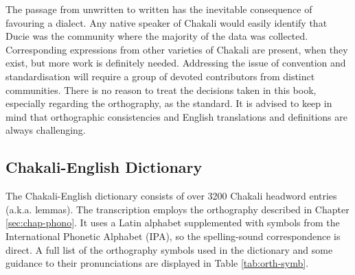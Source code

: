 The passage from unwritten to written has the inevitable consequence of 
favouring a dialect. Any native speaker of Chakali would easily identify that 
Ducie was the community where the majority of the data was collected.  
Corresponding expressions from other varieties of Chakali are present, when they 
exist,  but more work is definitely needed.   Addressing the issue of convention 
and standardisation will require a  group of devoted contributors from distinct 
communities. There is no reason to treat the decisions taken in this book, 
especially regarding the orthography,  as the standard. It is advised to keep in 
mind that orthographic consistencies  and English translations and definitions 
are always challenging. 





\subsection{Chakali-English Dictionary}
\label{sec:cli-eng-entry}



The Chakali-English dictionary consists of over 3200 Chakali 
headword 
entries (a.k.a. lemmas).
The transcription employs the 
orthography described in Chapter \ref{sec:chap-phono}.  It uses a Latin 
alphabet 
supplemented 
with symbols from the International 
Phonetic Alphabet (IPA), so the spelling-sound correspondence is direct.  A 
full list of the 
orthography symbols used in the dictionary and some guidance to their 
pronunciations are displayed in Table \ref{tab:orth-symb}.

